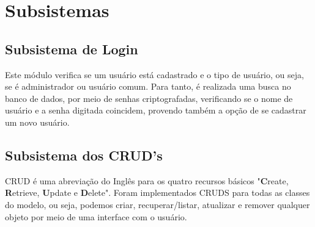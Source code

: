\documentclass[11pt, a4paper]{article}
\begin{document}
	\section{Subsistemas}
	
            \subsection{Subsistema  de Login}
                Este módulo verifica se um usuário está cadastrado e o tipo de usuário, ou seja, se é administrador ou usuário comum. Para tanto, é realizada uma busca no banco de dados, por meio de senhas criptografadas, verificando se o nome de usuário e a senha digitada coincidem, provendo também a opção de se cadastrar um novo usuário.
            
            \subsection{Subsistema dos CRUD's}
                CRUD é uma abreviação do Inglês para os quatro recursos básicos "\textbf{C}reate, \textbf{R}etrieve, \textbf{U}pdate e \textbf{D}elete". Foram implementados CRUDS para todas as classes do modelo, ou seja, podemos criar, recuperar/listar, atualizar e remover qualquer objeto por meio de uma interface com o usuário.
            
		
		
\end{document}
